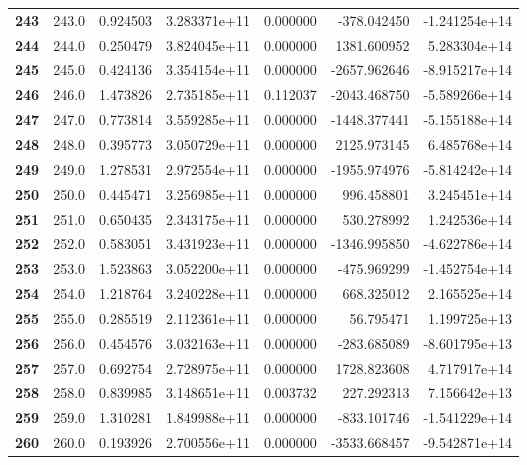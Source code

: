 \documentclass{report}[12pt]
\begin{document}
\begin{center}
\begin{tabular}{lrrrrrr}
\textbf{243 } &          243.0 &   0.924503 &  3.283371e+11 &    0.000000 &  -378.042450 & -1.241254e+14 \\
\textbf{244 } &          244.0 &   0.250479 &  3.824045e+11 &    0.000000 &  1381.600952 &  5.283304e+14 \\
\textbf{245 } &          245.0 &   0.424136 &  3.354154e+11 &    0.000000 & -2657.962646 & -8.915217e+14 \\
\textbf{246 } &          246.0 &   1.473826 &  2.735185e+11 &    0.112037 & -2043.468750 & -5.589266e+14 \\
\textbf{247 } &          247.0 &   0.773814 &  3.559285e+11 &    0.000000 & -1448.377441 & -5.155188e+14 \\
\textbf{248 } &          248.0 &   0.395773 &  3.050729e+11 &    0.000000 &  2125.973145 &  6.485768e+14 \\
\textbf{249 } &          249.0 &   1.278531 &  2.972554e+11 &    0.000000 & -1955.974976 & -5.814242e+14 \\
\textbf{250 } &          250.0 &   0.445471 &  3.256985e+11 &    0.000000 &   996.458801 &  3.245451e+14 \\
\textbf{251 } &          251.0 &   0.650435 &  2.343175e+11 &    0.000000 &   530.278992 &  1.242536e+14 \\
\textbf{252 } &          252.0 &   0.583051 &  3.431923e+11 &    0.000000 & -1346.995850 & -4.622786e+14 \\
\textbf{253 } &          253.0 &   1.523863 &  3.052200e+11 &    0.000000 &  -475.969299 & -1.452754e+14 \\
\textbf{254 } &          254.0 &   1.218764 &  3.240228e+11 &    0.000000 &   668.325012 &  2.165525e+14 \\
\textbf{255 } &          255.0 &   0.285519 &  2.112361e+11 &    0.000000 &    56.795471 &  1.199725e+13 \\
\textbf{256 } &          256.0 &   0.454576 &  3.032163e+11 &    0.000000 &  -283.685089 & -8.601795e+13 \\
\textbf{257 } &          257.0 &   0.692754 &  2.728975e+11 &    0.000000 &  1728.823608 &  4.717917e+14 \\
\textbf{258 } &          258.0 &   0.839985 &  3.148651e+11 &    0.003732 &   227.292313 &  7.156642e+13 \\
\textbf{259 } &          259.0 &   1.310281 &  1.849988e+11 &    0.000000 &  -833.101746 & -1.541229e+14 \\
\textbf{260 } &          260.0 &   0.193926 &  2.700556e+11 &    0.000000 & -3533.668457 & -9.542871e+14 \\

\end{tabular}
\end{center}
\end{document}
